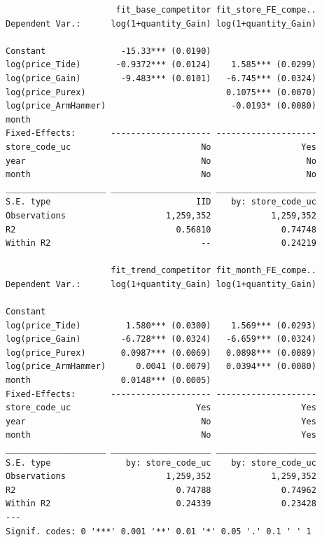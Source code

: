 \documentclass[
]{article}
\begin{document}
\begin{verbatim}
                      fit_base_competitor fit_store_FE_compe..
Dependent Var.:      log(1+quantity_Gain) log(1+quantity_Gain)
                                                              
Constant               -15.33*** (0.0190)                     
log(price_Tide)       -0.9372*** (0.0124)    1.585*** (0.0299)
log(price_Gain)        -9.483*** (0.0101)   -6.745*** (0.0324)
log(price_Purex)                            0.1075*** (0.0070)
log(price_ArmHammer)                         -0.0193* (0.0080)
month                                                         
Fixed-Effects:       -------------------- --------------------
store_code_uc                          No                  Yes
year                                   No                   No
month                                  No                   No
____________________ ____________________ ____________________
S.E. type                             IID    by: store_code_uc
Observations                    1,259,352            1,259,352
R2                                0.56810              0.74748
Within R2                              --              0.24219

                     fit_trend_competitor fit_month_FE_compe..
Dependent Var.:      log(1+quantity_Gain) log(1+quantity_Gain)
                                                              
Constant                                                      
log(price_Tide)         1.580*** (0.0300)    1.569*** (0.0293)
log(price_Gain)        -6.728*** (0.0324)   -6.659*** (0.0324)
log(price_Purex)       0.0987*** (0.0069)   0.0898*** (0.0089)
log(price_ArmHammer)      0.0041 (0.0079)   0.0394*** (0.0080)
month                  0.0148*** (0.0005)                     
Fixed-Effects:       -------------------- --------------------
store_code_uc                         Yes                  Yes
year                                   No                  Yes
month                                  No                  Yes
____________________ ____________________ ____________________
S.E. type               by: store_code_uc    by: store_code_uc
Observations                    1,259,352            1,259,352
R2                                0.74788              0.74962
Within R2                         0.24339              0.23428
---
Signif. codes: 0 '***' 0.001 '**' 0.01 '*' 0.05 '.' 0.1 ' ' 1
\end{verbatim}
\end{document}
